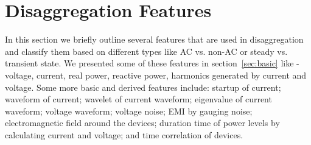 \section{Disaggregation Features}
\label{sec:features}
%

In this section we briefly outline several features that are used in disaggregation and
classify them based on different types like AC vs. non-AC or steady vs. transient state. 
%
We presented
some of these features in section~\ref{sec:basic} like - voltage, current, real power, 
reactive power, harmonics generated by current and voltage. Some more basic and 
derived features
include: startup of current; waveform of current;
wavelet of current waveform; eigenvalue of current waveform;
voltage waveform; voltage noise; EMI
by gauging noise; electromagnetic field around the devices; 
duration time of power levels by calculating current and voltage; 
and time correlation of devices. 


